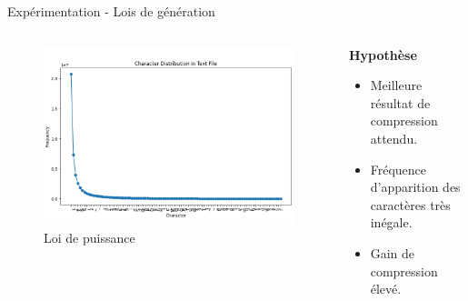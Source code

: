\documentclass{beamer}
\begin{document}
\begin{frame}{Expérimentation - Lois de génération}
    \begin{columns}[T]
        \begin{column}{0.6\textwidth}
            \begin{figure}
                \centering
                \includegraphics[width=\textwidth]{../assets/puissance.png}
                \caption{Loi de puissance}
            \end{figure}
        \end{column}
        \begin{column}{0.5\textwidth}
            \vspace{10pt}
            \textbf{Hypothèse} \\
            \vspace{10pt}
            \begin{itemize}
                \item Meilleure résultat de compression attendu.
                \item Fréquence d'apparition des caractères très inégale.
                \item Gain de compression élevé.
            \end{itemize}
        \end{column}
    \end{columns}
\end{frame}
\end{document}
